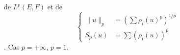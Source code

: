  de $L^p(E,F)$ et de 
\[
\left\{\begin{aligned}
\|u\|_p&=\left(\sum\rho_i(u)^p\right)^{1/p}\\
S_p(u)&=\sum(\rho_i(u))^p
\end{aligned}\right.
\]
  . Cas $p=+\infty$, $p=1$.
